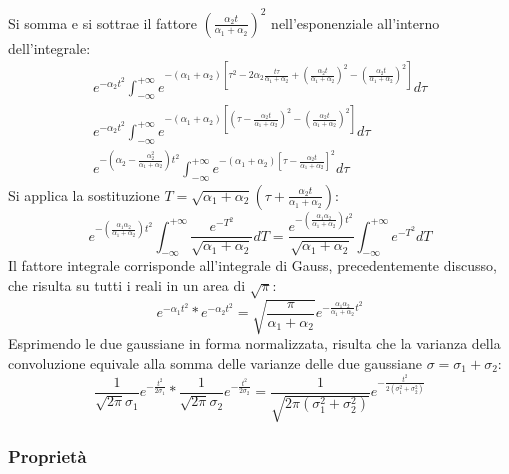 \documentclass{article}
\numberwithin{equation}{subsection}
\begin{document}
Si somma e si sottrae il fattore $\displaystyle\left(\frac{\alpha_2t}{\alpha_1+\alpha_2}\right)^2$ nell'esponenziale all'interno dell'integrale:
\begin{gather*}
    \displaystyle e^{-\alpha_2 t^2}\int_{-\infty}^{+\infty}e^{-(\alpha_1+\alpha_2)\left[\tau^2-2\alpha_2\frac{t\tau}{\alpha_1+\alpha_2}+\left(\frac{\alpha_2t}{\alpha_1+\alpha_2}\right)^2-\left(\frac{\alpha_2t}{\alpha_1+\alpha_2}\right)^2\right]}d\tau\\
    \displaystyle e^{-\alpha_2 t^2}\int_{-\infty}^{+\infty}e^{-(\alpha_1+\alpha_2)\left[\left(\tau-\frac{\alpha_2t}{\alpha_1+\alpha_2}\right)^2-\left(\frac{\alpha_2t}{\alpha_1+\alpha_2}\right)^2\right]}d\tau\\
    \displaystyle e^{-\left(\alpha_2-\frac{\alpha_2^2}{\alpha_1+\alpha_2}\right)t^2}\int_{-\infty}^{+\infty}e^{-(\alpha_1+\alpha_2)\left[\tau-\frac{\alpha_2t}{\alpha_1+\alpha_2}\right]^2}d\tau
\end{gather*}
Si applica la sostituzione $T=\displaystyle\sqrt{\alpha_1+\alpha_2}\left(\tau+\frac{\alpha_2t}{\alpha_1+\alpha_2}\right)$:
\begin{equation*}
    \displaystyle e^{-\left(\frac{\alpha_1\alpha_2}{\alpha_1+\alpha_2}\right)t^2}\int_{-\infty}^{+\infty}\frac{e^{-T^2}}{\sqrt{\alpha_1+\alpha_2}}dT=\frac{e^{-\left(\frac{\alpha_1\alpha_2}{\alpha_1+\alpha_2}\right)t^2}}{\sqrt{\alpha_1+\alpha_2}}\int_{-\infty}^{+\infty}{e^{-T^2}}dT
\end{equation*}
Il fattore integrale corrisponde all'integrale di Gauss, precedentemente discusso, che risulta su tutti i reali in un area di $\sqrt\pi$:
\begin{equation*}
    e^{-\alpha_1t^2}*e^{-\alpha_2t^2}=\displaystyle\sqrt{\frac{\pi}{\alpha_1+\alpha_2}}e^{-\frac{\alpha_1\alpha_2}{\alpha_1+\alpha_2}t^2}
\end{equation*}
Esprimendo le due gaussiane in forma normalizzata, risulta che la varianza della convoluzione equivale alla somma delle varianze delle due gaussiane $\sigma=\sigma_1+\sigma_2$:
\begin{equation}
    \displaystyle\frac{1}{\sqrt{2\pi}\sigma_1}e^{-\frac{t^2}{2\sigma_1}}*\frac{1}{\sqrt{2\pi}\sigma_2}e^{-\frac{t^2}{2\sigma_2}}=\frac{1}{\sqrt{2\pi(\sigma_1^2+\sigma_2^2)}}e^{-\frac{t^2}{2(\sigma_1^2+\sigma_2^2)}}
\end{equation}

\subsubsection{Proprietà}
\end{document}
